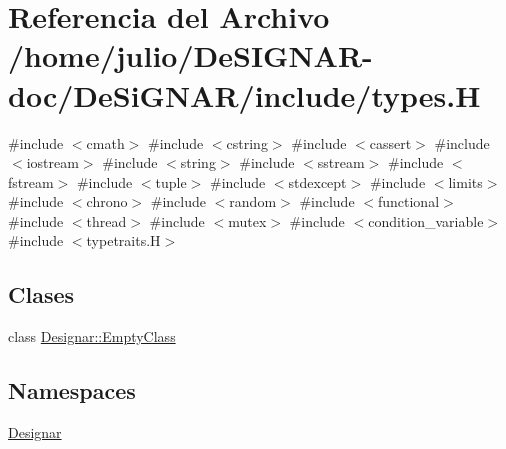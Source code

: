 \hypertarget{types_8_h}{}\section{Referencia del Archivo /home/julio/\+De\+S\+I\+G\+N\+A\+R-\/doc/\+De\+Si\+G\+N\+A\+R/include/types.H}
\label{types_8_h}
{\ttfamily \#include $<$cmath$>$}\newline
{\ttfamily \#include $<$cstring$>$}\newline
{\ttfamily \#include $<$cassert$>$}\newline
{\ttfamily \#include $<$iostream$>$}\newline
{\ttfamily \#include $<$string$>$}\newline
{\ttfamily \#include $<$sstream$>$}\newline
{\ttfamily \#include $<$fstream$>$}\newline
{\ttfamily \#include $<$tuple$>$}\newline
{\ttfamily \#include $<$stdexcept$>$}\newline
{\ttfamily \#include $<$limits$>$}\newline
{\ttfamily \#include $<$chrono$>$}\newline
{\ttfamily \#include $<$random$>$}\newline
{\ttfamily \#include $<$functional$>$}\newline
{\ttfamily \#include $<$thread$>$}\newline
{\ttfamily \#include $<$mutex$>$}\newline
{\ttfamily \#include $<$condition\+\_\+variable$>$}\newline
{\ttfamily \#include $<$typetraits.\+H$>$}\newline
\subsection*{Clases}
\begin{DoxyCompactItemize}
\item 
class \hyperlink{class_designar_1_1_empty_class}{Designar\+::\+Empty\+Class}
\end{DoxyCompactItemize}
\subsection*{Namespaces}
\begin{DoxyCompactItemize}
\item 
 \hyperlink{namespace_designar}{Designar}
\end{DoxyCompactItemize}
